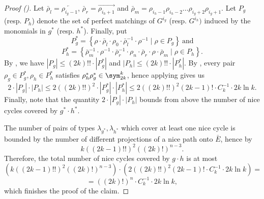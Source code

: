 \begin{proof}[Proof ()]
    Let $\bar\rho_l = \overleftarrow{\rho_{i_g - 1}}$, $\bar\rho_r = \overrightarrow{\rho_{i_h+1}}$ and $\bar\rho_m = \rho_{i_h - 1}\rho_{i_h - 2}\dots\rho_{i_g + 2}\rho_{i_g + 1}$. Let $P_g$ (resp. $P_h$) denote the set of perfect matchings of $G^{i_g}$ (resp. $G^{i_h})$ induced by the monomials in $g^*$ (resp. $h^*$). Finally, put
    $$
        P_g^* = \left\{
            \rho \cdot
            \bar\rho_l \cdot 
            \rho_0 \cdot 
            \bar\rho_l^{-1} \cdot 
            \rho^{-1}
            \mid \rho \in P_g
        \right\} \ \text{and}
    $$
    $$
        P_h^* = \left\{
            \bar\rho_m^{-1} \cdot
            \rho^{-1} \cdot
            \bar\rho_r^{-1} \cdot 
            \rho_n \cdot 
            \bar\rho_r \cdot 
            \rho \cdot
            \bar\rho_m
            \mid \rho \in P_h
        \right\}.
    $$
    By , we have $|P_g| \leq (2k)!! \cdot |P_g^*|$ and $|P_h| \leq (2k)!! \cdot |P_h^*|$.
    By , every pair $\rho_g \in P_g^*, \rho_h \in P_h^*$ satisfies $\rho_h^* \rho_g^* \in \sym_{2k}^k$, hence applying  gives us
    $$
        2 \cdot |P_g| \cdot |P_h| \leq
        2 ((2k)!!)^2 \cdot |P_g^*| \cdot |P_h^*| \leq
        2 ((2k)!!)^2 (2k - 1)! \cdot C_k^{-1} \cdot 2k \ln k.
    $$
    Finally, note that the quantity $2 \cdot |P_g| \cdot |P_h|$ bounds from above the number of nice cycles covered by $g^* \cdot h^*$.

    The number of pairs of types $\lambda_{g^*}, \lambda_{h^*}$ which cover at least one nice cycle is bounded by the number of different projections of a nice path onto $\bar{E}$, hence by
    $$
    k ((2k - 1)!!)^2 ((2k)!)^{n - 3}.
    $$
    Therefore, the total number of nice cycles covered by $g \cdot h$ is at most
    $$
    \left( k ((2k - 1)!!)^2 ((2k)!)^{n - 3} \right) \cdot
    \left( 2 ((2k)!!)^2 (2k - 1)! \cdot C_k^{-1} \cdot 2k \ln k \right) =
    $$
    $$
    = ((2k)!)^n \cdot C_k^{-1} \cdot 2k \ln k,
    $$
    which finishes the proof of the claim.

\end{proof}
